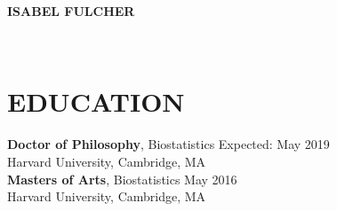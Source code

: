 \documentclass[12pt]{article}
\begin{document}
\newcommand{\MYhref}[3][blue]{\href{#2}{\color{#1}{#3}}}%
	\begin{center}
	\textbf{
			{\huge I}{\Large SABEL} \hspace{-0.1em} 
			{\huge F}{\Large ULCHER}}\\
\end{center}
\begin{minipage}[t]{0.5\linewidth}
\begin{flushleft}
     \MYhref[black]{mailto:isabelfulcher@g.harvard.edu}{isabelfulcher@g.harvard.edu} \\
    \MYhref[black]{http://orcid.org/0000-0002-1209-824X}{ORCID: 0000-0002-1209-824X} 
         \end{flushleft}
\end{minipage}
\begin{minipage}[t]{0.5\linewidth} 
    \begin{flushright}  
    {\LARGE
  \href{http://isabelfulcher.github.io}{\faFirefox} \href{https://github.com/isabelfulcher}{\faGithub}  \href{https://scholar.google.com/citations?user=0-9RLbQAAAAJ&hl=en}{\faGoogle} \href{https://twitter.com/isabelfulcher}{\faTwitter} \href{mailto:isabelfulcher@g.harvard.edu}{\faEnvelope }   \par
    }
    \end{flushright}  
\end{minipage}


\section*{\textbf{{\Large E}{\small DUCATION}}}

%
%
%
%


\textbf{Doctor of Philosophy}, Biostatistics \hfill \hfill Expected: May 2019 \\
Harvard University, Cambridge, MA \\

\textbf{Masters of Arts}, Biostatistics \hfill \hfill May 2016 \\
Harvard University, Cambridge, MA \\
\end{document}
